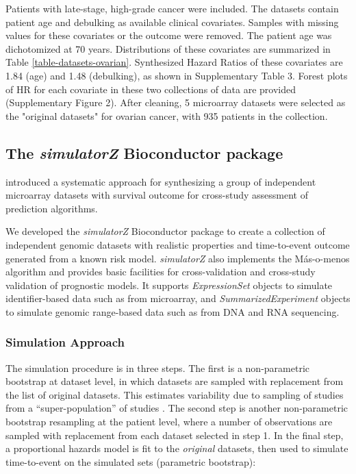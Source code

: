 \documentclass{bioinfo}
\begin{document}
  Patients with late-stage, high-grade cancer were included. 
  The datasets contain patient age and debulking as available 
  clinical covariates. Samples with missing values for these covariates or the outcome were removed. The patient age was dichotomized at 70 years. Distributions 
  of these covariates are summarized in Table \ref{table-datasets-ovarian}. Synthesized Hazard Ratios 
  of these covariates are 1.84 (age) and 1.48 (debulking), 
  as shown in Supplementary Table 3. Forest plots of HR for 
  each covariate in these two collections of data
  are provided (Supplementary Figure 2). After cleaning, 5 microarray datasets were selected as the "original datasets" for ovarian cancer, with 935 patients in the collection.
  

  \subsection{The \emph{simulatorZ} Bioconductor package}
 

  \citet{Bernau2014} introduced a systematic approach for synthesizing a
  group of independent microarray datasets with survival outcome for
  cross-study assessment of prediction algorithms. %

  We developed the \emph{simulatorZ} Bioconductor package to
  create a collection of independent genomic datasets with
  realistic properties and time-to-event outcome generated from a
  known risk model. \emph{simulatorZ} also implements the M\'{a}s-o-menos algorithm
  \citep{Zhao2014,donoho2008higher} and provides basic facilities for 
  cross-validation and cross-study validation of prognostic models.
  It supports \emph{ExpressionSet} objects to simulate
  identifier-based data such as from microarray, and
  \emph{SummarizedExperiment} objects to simulate genomic range-based
  data such as from DNA and RNA sequencing.

    \subsubsection{Simulation Approach}
    The simulation procedure is in three steps. The first is a non-parametric
    bootstrap at dataset level, in which datasets are sampled with
    replacement from the list of original datasets. This
    estimates variability due to sampling of studies from a
    ``super-population'' of studies \citep{Hartley1975-bj}.  The
    second step is another
    non-parametric bootstrap resampling at the patient
    level, where a number of observations are sampled with replacement from
    each dataset selected in step 1.
    In the final step, a proportional hazards model is fit to the \emph{original} datasets, then used to
    simulate time-to-event on the simulated sets (parametric
    bootstrap):
\end{document}
